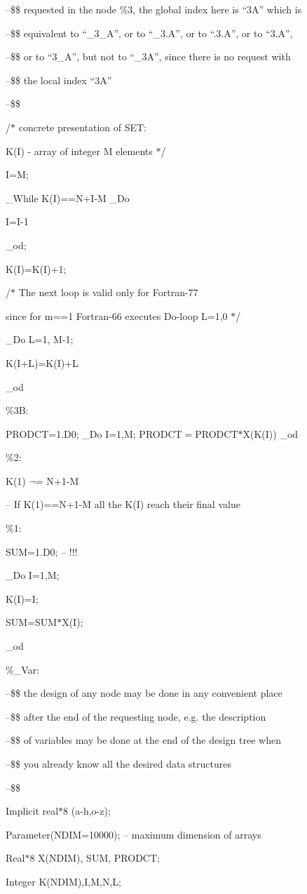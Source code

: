 {{\qquad--\$\$  requested in the node \%3, the global index here is
\qquad \qquad \qquad \qquad ``3A'' which is

\qquad--\$\$  equivalent to ``\_3\_A'', or to ``\_3.A'', or to ``.3.A'',
\qquad \qquad \qquad \qquad or to ``3.A'',

\qquad--\$\$  or to ``3\_A'', but not to ``\_3A'', since there is no
\qquad \qquad \qquad \qquad request with

\qquad--\$\$  the local index ``3A''

\qquad--\$\$

\qquad /$*$ concrete presentation of  SET:

\qquad \qquad  K(I) - array of integer  M  elements $*$/

\qquad I=M;

\qquad \_While K(I)==N+I-M \_Do

\qquad \qquad  I=I-1

\qquad \_od;

\qquad K(I)=K(I)+1;

/$*$ The next loop is valid only for Fortran-77

 \qquad since for  m==1  Fortran-66  executes Do-loop L=1,0 $*$/

\qquad \_Do L=1, M-1;

\qquad \quad  K(I+L)=K(I)+L

\qquad \_od

\%3B:

\qquad PRODCT=1.D0;
\qquad \_Do I=1,M;
\qquad \quad PRODCT$=$PRODCT$*$X(K(I))
\qquad \_od

\%2:

\qquad K(1) $\neg$= N+1-M

\qquad-- If K(1)==N+1-M all the K(I) reach their final value

\%1:

\qquad SUM=1.D0; -- !!!

\qquad \_Do I=1,M;

\qquad  \quad K(I)=I;

\qquad \quad SUM=SUM$*$X(I);

\qquad  \_od

\%\_Var:

\qquad--\$\$ the design of any node may be done in any convenient place

\qquad--\$\$ after the end of the requesting node, e.g. the description

\qquad--\$\$ of variables may be done at the end of the design tree when

\qquad--\$\$ you already know all the desired data structures

\qquad--\$\$

\qquad\quad Implicit real$*$8 (a-h,o-z);

\quad \qquad Parameter(NDIM=10000); -- maximum dimension of arrays

\quad \qquad Real$*$8 X(NDIM), SUM, PRODCT;

\quad \qquad Integer K(NDIM),I,M,N,L; } \par}

